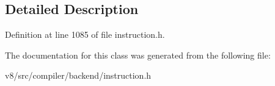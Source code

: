 \subsection{Detailed Description}


Definition at line 1085 of file instruction.\+h.



The documentation for this class was generated from the following file\+:\begin{DoxyCompactItemize}
\item 
v8/src/compiler/backend/instruction.\+h\end{DoxyCompactItemize}
